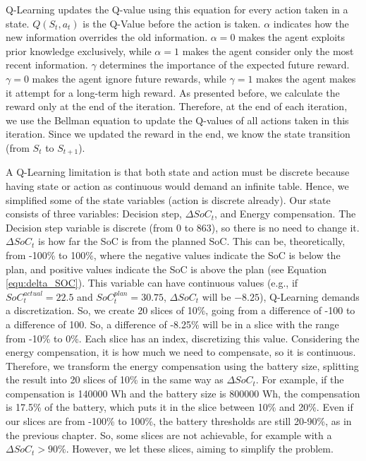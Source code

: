 Q-Learning updates the Q-value using this equation for every action taken in a state. $Q(S_t, a_t)$ is the Q-Value before the action is taken. $\alpha$ indicates how the new information overrides the old information. $\alpha = 0$ makes the agent exploits prior knowledge exclusively, while $\alpha = 1$ makes the agent consider only the most recent information. $\gamma$ determines the importance of the expected future reward. $\gamma = 0$ makes the agent ignore future rewards, while $\gamma = 1$ makes the agent makes it attempt for a long-term high reward. As presented before, we calculate the reward only at the end of the iteration. Therefore, at the end of each iteration, we use the Bellman equation to update the Q-values of all actions taken in this iteration. Since we updated the reward in the end, we know the state transition (from $S_{t}$ to $S_{t+1}$).

A Q-Learning limitation is that both state and action must be discrete because having state or action as continuous would demand an infinite table. Hence, we simplified some of the state variables (action is discrete already). Our state consists of three variables: Decision step, $\Delta SoC_t$, and Energy compensation. The Decision step variable is discrete (from 0 to 863), so there is no need to change it. $\Delta SoC_t$ is how far the SoC is from the planned SoC. This can be, theoretically, from -100\% to 100\%, where the negative values indicate the SoC is below the plan, and positive values indicate the SoC is above the plan (see Equation \ref{equ:delta_SOC}). This variable can have continuous values (e.g., if $SoC^{actual}_{t} = 22.5$ and $SoC^{plan}_{t} = 30.75$, $\Delta SoC_t$ will be $-8.25$), Q-Learning demands a discretization. So, we create 20 slices of 10\%, going from a difference of -100 to a difference of 100. So, a difference of -8.25\% will be in a slice with the range from -10\% to 0\%. Each slice has an index, discretizing this value. Considering the energy compensation, it is how much we need to compensate, so it is continuous. Therefore, we transform the energy compensation using the battery size, splitting the result into 20 slices of 10\% in the same way as $\Delta SoC_t$. For example, if the compensation is 140000 Wh and the battery size is 800000 Wh, the compensation is 17.5\% of the battery, which puts it in the slice between 10\% and 20\%. Even if our slices are from -100\% to 100\%, the battery thresholds are still 20-90\%, as in the previous chapter. So, some slices are not achievable, for example with a $\Delta SoC_t > 90\%$. However, we let these slices, aiming to simplify the problem.

